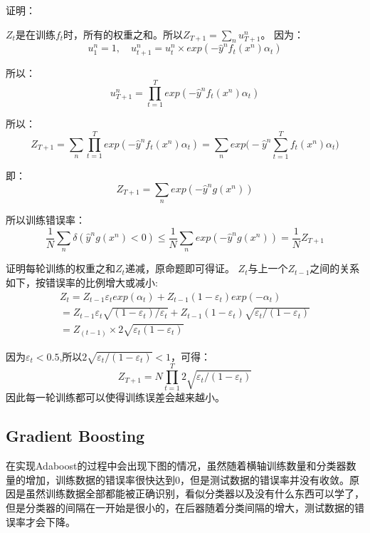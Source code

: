 \documentclass[UTF8]{ctexart} %
\begin{document}
			证明：
			
			$Z_t$是在训练$f_t$时，所有的权重之和。所以$Z_{T+1} = \sum_nu_{T+1}^n$。
			因为：
			\[u_1^n=1,\quad u_{t+1}^n=u_t^n\times exp(-\hat{y}^nf_t(x^n)\alpha_t)\]
			
			所以：
			\[u_{T+1}^n = \prod_{t=1}^Texp(-\hat{y}^nf_t(x^n)\alpha_t)\]
			
			所以：
			\[Z_{T+1} = \sum_n\prod_{t=1}^Texp(-\hat{y}^nf_t(x^n)\alpha_t)
			=\sum_nexp\Big(-\hat{y}^n\sum_{t=1}^Tf_t(x^n)\alpha_t\Big)\]
			
			即：
			\[Z_{T+1} = \sum_nexp(-\hat{y}^ng(x^n))\]
			
			所以训练错误率：
			\[\frac{1}{N}\sum_n\delta(\hat{y}^ng(x^n)<0)\leq\frac{1}{N}\sum_nexp(-\hat{y}^ng(x^n))=\frac{1}{N}Z_{T+1}\]
			
			证明每轮训练的权重之和$Z_t$递减，原命题即可得证。
			$Z_t$与上一个$Z_{t-1}$之间的关系如下，按错误率的比例增大或减小:
			\[\begin{aligned}
			Z_t = Z_{t-1}\varepsilon_texp(\alpha_t)+Z_{t-1}(1-\varepsilon_t)exp(-\alpha_t)\\
			=Z_{t-1}\varepsilon_t\sqrt{(1-\varepsilon_t)/\varepsilon_t}+ Z_{t-1}(1-\varepsilon_t)\sqrt{\varepsilon_t/(1-\varepsilon_t)}\\
			=Z_(t-1)\times2\sqrt{\varepsilon_t(1-\varepsilon_t)}
			\end{aligned}\]
			
			因为$\varepsilon_t< 0.5$,所以$2\sqrt{\varepsilon_t/(1-\varepsilon_t)} < 1$，可得：
			\[Z_{T+1} = N\prod_{t=1}^T2\sqrt{\varepsilon_t/(1-\varepsilon_t)}\]
			因此每一轮训练都可以使得训练误差会越来越小。
			
		\subsection{Gradient Boosting}
			在实现Adaboost的过程中会出现下图的情况，虽然随着横轴训练数量和分类器数量的增加，训练数据的错误率很快达到0，但是测试数据的错误率并没有收敛。原因是虽然训练数据全部都能被正确识别，看似分类器以及没有什么东西可以学了，但是分类器的间隔在一开始是很小的，在后器随着分类间隔的增大，测试数据的错误率才会下降。
			\begin{figure}[H]
			\end{figure}
			
\end{document}
